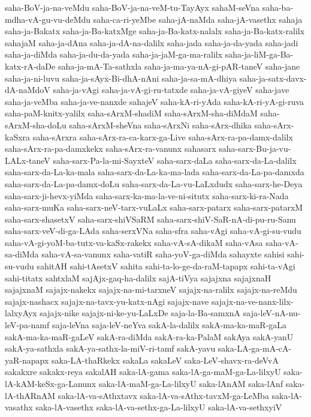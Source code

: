 {saha-BoV-ja-na-veMdu
saha-BoV-ja-na-veM-tu-TayAyx
sahaM-seVna
saha-ba-mdha-vA-gu-vu-deMdu
saha-ca-ri-yeMbe
saha-jA-naMda
saha-jA-vasethx
sahaja
saha-ja-Bakatx
saha-ja-Ba-katxMge
saha-ja-Ba-katx-nalalx
saha-ja-Ba-katx-ralilx
sahajaM
saha-ja-dAna
saha-ja-dA-na-dalilx
saha-jada
saha-ja-da-yada
saha-jadi
saha-ja-diMda
saha-ja-du-da-yada
saha-ja-jaM-ga-ma-ralilx
saha-ja-liM-ga-Ba-katx-rA-daDe
saha-ja-mA-Ta-sathxla
saha-ja-ma-ya-nA-gi-pAR-taneV
saha-jane
saha-ja-ni-luvu
saha-ja-sAyx-Bi-dhA-nAni
saha-ja-sa-mA-dhiya
saha-ja-satx-davx-dA-naMdoV
saha-ja-vAgi
saha-ja-vA-gi-ru-tatxde
saha-ja-vA-giyeV
saha-jave
saha-ja-veMba
saha-ja-ve-nanxde
sahajeV
saha-kA-ri-yAda
saha-kA-ri-yA-gi-ruva
saha-paM-knitx-yalilx
saha-sArxM-shadiM
saha-sArxM-sha-diMdaM
saha-sArxM-sha-doLu
saha-sArxM-sheVna
saha-sArxNi
saha-sArx-dhika
saha-sArx-kaSxra
saha-sArxra
saha-sArx-ra-ca-karx-ga-Live
saha-sArx-ra-pa-damx-dalilx
saha-sArx-ra-pa-damxkekx
saha-sArx-ra-vanunx
sahasarx
saha-sarx-Bu-ja-vu-LALx-taneV
saha-sarx-Pa-la-mi-SayxteV
saha-sarx-daLa
saha-sarx-da-La-dalilx
saha-sarx-da-La-ka-mala
saha-sarx-da-La-ka-ma-lada
saha-sarx-da-La-pa-damxda
saha-sarx-da-La-pa-damx-doLu
saha-sarx-da-La-vu-LaLxdudx
saha-sarx-he-Deya
saha-sarx-ji-hevx-yiMda
saha-sarx-ka-ma-la-ve-ni-situtx
saha-sarx-ki-ra-Nada
saha-sarx-muKa
saha-sarx-neV-tarx-vuLaLx
saha-sarx-patarx
saha-sarx-patarxM
saha-sarx-shasetxV
saha-sarx-shiVSaRM
saha-sarx-shiV-SaR-nA-di-pu-ru-Sanu
saha-sarx-veV-di-ga-LAda
saha-serxVNa
saha-sfra
saha-vAgi
saha-vA-gi-su-vudu
saha-vA-gi-yoM-ba-tutx-va-kaSx-rakekx
saha-vA-sA-dikaM
saha-vAsa
saha-vA-sa-diMda
saha-vA-sa-vanunx
saha-vatiR
saha-yoV-ga-diMda
sahayxte
sahisi
sahi-su-vudu
sahitAH
sahi-tAsetxV
sahita
sahi-ta-lo-ge-da-raM-tapapx
sahi-ta-vAgi
sahi-titatx
sahtxlaM
sajAjx-gaq-ha-dalilx
sajA-tiVya
sajajxna
sajajxnaH
sajajxnaM
sajajx-nakekx
sajajx-na-mi-tarxneV
sajajx-na-ralilx
sajajx-na-reMdu
sajajx-nashacx
sajajx-na-tavx-yu-katx-nAgi
sajajx-nave
sajajx-na-ve-nanx-lilx-lalxyAyx
sajajx-nike
sajajx-ni-ke-yu-LaLxDe
saja-la-Ba-samxnA
saja-leV-nA-nu-leV-pa-namf
saja-leVna
saja-leV-neYva
sakA-la-dalilx
sakA-ma-ka-maR-gaLa
sakA-ma-ka-maR-gaLeV
sakA-ra-diMda
sakA-ra-ka-PalaM
sakAya
sakA-yanU
sakA-ya-sathxla
sakA-ya-sathx-la-miV-ri-tamf
sakA-yavu
saka-LA-ga-mA-cA-yaR-napapx
saka-LA-thaRkekx
sakaLa
sakaLeV
saka-LeV-shavx-ra-deVvA
sakakxre
sakakx-reya
sakalAH
saka-lA-gama
saka-lA-ga-maM-ga-La-lilxyU
saka-lA-kAM-keSx-ga-Lanunx
saka-lA-maM-ga-La-lilxyU
saka-lAnAM
saka-lAnf
saka-lA-thARnAM
saka-lA-va-sAthxtavx
saka-lA-va-sAthx-tavxM-ga-LeMba
saka-lA-vasathx
saka-lA-vasethx
saka-lA-va-sethx-ga-La-lilxyU
saka-lA-va-sethxyiV
}

